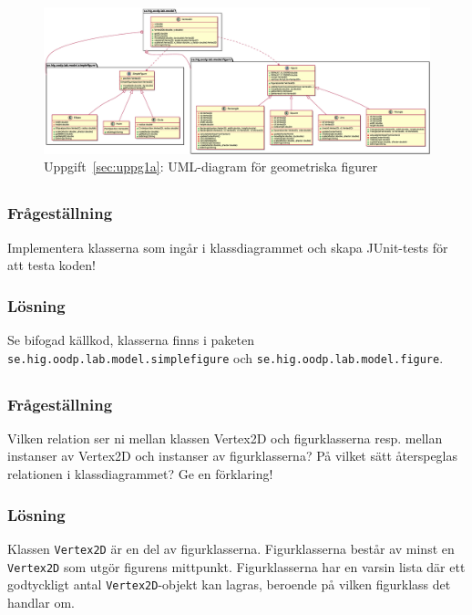\begin{figure}[htbp]
\centering
\includegraphics[width=\linewidth]{diagram/uppgift2-icons.eps}
\caption{Uppgift~\ref{sec:uppg1a}: UML-diagram för geometriska figurer}
\label{fig:uppg1a}
\end{figure}


\subsection{}\label{uppg1b}
\subsubsection*{Frågeställning}
Implementera klasserna som ingår i klassdiagrammet och skapa JUnit-tests för
att testa koden!

\subsubsection*{Lösning}
Se bifogad källkod, klasserna finns i paketen
\texttt{se.hig.oodp.lab.model.simplefigure} och
\texttt{se.hig.oodp.lab.model.figure}.



\subsection{}\label{uppg1c}
\subsubsection*{Frågeställning}
Vilken relation ser ni mellan klassen Vertex2D och figurklasserna resp. mellan
instanser av Vertex2D och instanser av figurklasserna? På vilket sätt 
återspeglas relationen i klassdiagrammet? Ge en förklaring!

\subsubsection*{Lösning}
Klassen \texttt{Vertex2D} är en del av figurklasserna. Figurklasserna består
av minst en \texttt{Vertex2D} som utgör figurens mittpunkt. Figurklasserna
har en varsin lista där ett godtyckligt antal \texttt{Vertex2D}-objekt kan
lagras, beroende på vilken figurklass det handlar om.


